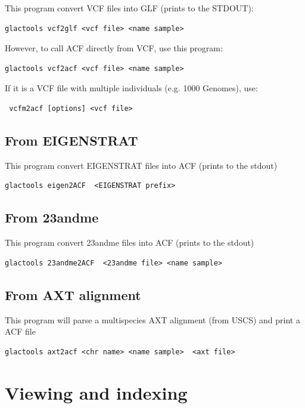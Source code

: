\documentclass[a4paper]{article}
\begin{document}
\noindent This program convert VCF files into GLF (prints to the STDOUT):

\begin{lstlisting}
glactools vcf2glf <vcf file> <name sample> 
\end{lstlisting}

However, to call ACF directly from VCF, use this program:

\begin{lstlisting}
glactools vcf2acf <vcf file> <name sample> 
\end{lstlisting}

If it is a VCF file with multiple individuals (e.g. 1000 Genomes), use:
\begin{lstlisting}
 vcfm2acf [options] <vcf file>
\end{lstlisting}

\subsection{From EIGENSTRAT}

\noindent This program convert EIGENSTRAT files into ACF (prints to the stdout)

\begin{lstlisting}
glactools eigen2ACF  <EIGENSTRAT prefix>
\end{lstlisting}


\subsection{From 23andme}

\noindent This program convert 23andme files into ACF (prints to the stdout)

\begin{lstlisting}
glactools 23andme2ACF  <23andme file> <name sample>
\end{lstlisting}

\subsection{From AXT alignment}

\noindent This program will parse a multispecies AXT alignment (from USCS) and print a ACF file

\begin{lstlisting}
glactools axt2acf <chr name> <name sample>  <axt file>
\end{lstlisting}

\newpage
\section{Viewing and indexing}
\end{document}
